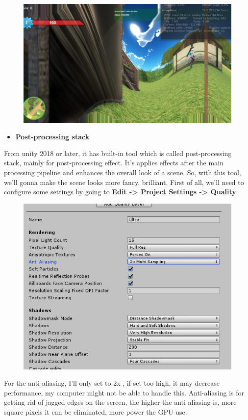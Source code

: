 \documentclass[a4paper, 13pt]{extarticle}
\begin{document}
{\begin{figure}[h]
 	\begin{minipage}{1\textwidth}
 		\centering
 		\includegraphics[width=0.7\linewidth]{intructions/dizzy.png}
 		\centering
 		\label{fig:test33}
 	\end{minipage}      	
 \end{figure}
\begin{itemize}
	\item \bfseries Post-processing stack 
\end{itemize} 
From unity 2018 or later, it has built-in tool which is called post-processing stack, mainly for post-processing effect.  It’s applies effects after the main processing pipeline and enhances the overall look of a scene. So, with this tool, we'll gonna make the scene looks more fancy, brilliant. 
First of all, we'll need to configure some settings by going to {\bfseries Edit -> Project Settings -> Quality}. 
  \begin{figure}[h] 
 	\begin{minipage}{1\textwidth}
 		\centering
 		\includegraphics[width=0.5\linewidth]{intructions/quality_setting.png}
 		\centering
 		\label{fig:test34}
 	\end{minipage}      	
 \end{figure}
For the anti-aliasing, I'll only set to 2x , if set too high, it may decrease performance, my computer might not be able to handle this. Anti-aliasing is for getting rid of jagged edges on the screen, the higher the anti aliasing is, more square pixels it can be eliminated, more power the GPU use. \\

}
\end{document}
